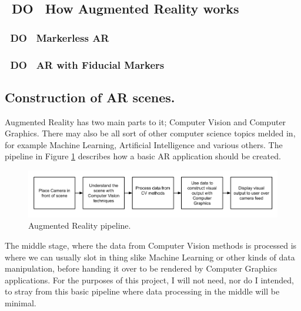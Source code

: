 \documentclass[11pt]{article}
\begin{document}
\subsection{~DO~ How Augmented Reality works}
\subsubsection{~DO~ Markerless AR}
\subsubsection{~DO~ AR with Fiducial Markers}

\subsection{Construction of AR scenes.}
Augmented Reality has two main parts to it; Computer Vision and Computer Graphics.
There may also be all sort of other computer science topics melded in, for
example Machine Learning, Artificial Intelligence and various others. 
The pipeline in Figure \ref{fig:arpipeline} describes how a basic AR 
application should be created.\\

\begin{figure} 
	\includegraphics[scale=0.5]{pics/ARpipeline}
	\caption{Augmented Reality pipeline.}
	\label{fig:arpipeline}
\end{figure}

The middle stage, where the data from Computer Vision methods is processed
is where we can usually slot in thing slike Machine Learning or other kinds
of data manipulation, before handing it over to be rendered by Computer
Graphics applications. For the purposes of this project, I will not need,
nor do I intended, to stray from this basic pipeline where data processing in 
the middle will be minimal.
\end{document}
